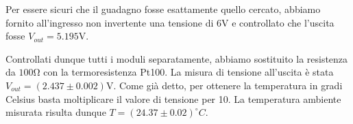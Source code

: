 Per essere sicuri che il guadagno fosse esattamente quello cercato, abbiamo fornito all'ingresso non invertente una tensione di $6\si{\volt}$ e controllato che l'uscita fosse $V_{out}=5.195 \si{\volt}$. 

Controllati dunque tutti i moduli separatamente, abbiamo sostituito la resistenza da $100\si{\ohm}$ con la termoresistenza Pt100. La misura di tensione all'uscita è stata $V_{out}=(2.437\pm 0.002)\si{\volt}$. Come già detto, per ottenere la temperatura in gradi Celsius basta moltiplicare il valore di tensione per 10. La temperatura ambiente misurata risulta dunque $T=(24.37\pm0.02)^{\circ}C$.











